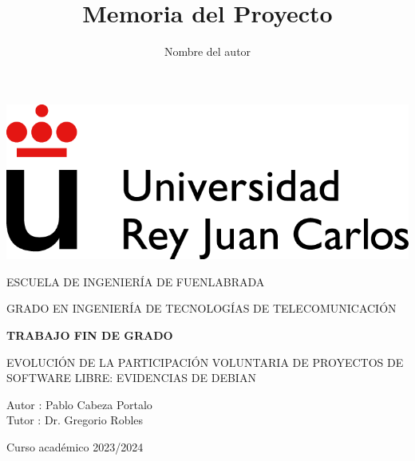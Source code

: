 \documentclass[a4paper, 12pt]{book}
\title{Memoria del Proyecto}
\author{Nombre del autor}
\begin{document}
\renewcommand{\refname}{Bibliografía}  %
\renewcommand{\appendixname}{Apéndice}



\begin{titlepage}
\begin{center}
\includegraphics[scale=0.6]{img/URJ_logo_Color_POS.png}

\vspace{1.75cm}

\LARGE
ESCUELA DE INGENIERÍA DE FUENLABRADA
\vspace{1cm}

\LARGE
GRADO EN INGENIERÍA DE TECNOLOGÍAS DE TELECOMUNICACIÓN

\vspace{1cm}
\LARGE
\textbf{TRABAJO FIN DE GRADO}

\vspace{2cm}

\Large
EVOLUCIÓN DE LA PARTICIPACIÓN VOLUNTARIA DE PROYECTOS DE SOFTWARE LIBRE:
EVIDENCIAS DE DEBIAN

\vspace{2cm}

\large
Autor : Pablo Cabeza Portalo \\
Tutor : Dr. Gregorio Robles\\

\vspace{1cm}

\large
Curso académico 2023/2024

\end{center}
\end{titlepage}

\newpage
\mbox{}
\thispagestyle{empty} %



\clearpage
{}
\chapter*{}
\end{document}
